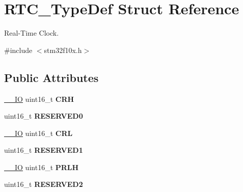 \hypertarget{struct_r_t_c___type_def}{\section{R\-T\-C\-\_\-\-Type\-Def Struct Reference}
\label{struct_r_t_c___type_def}
}


Real-\/\-Time Clock.  




{\ttfamily \#include $<$stm32f10x.\-h$>$}

\subsection*{Public Attributes}
\begin{DoxyCompactItemize}
\item 
\hypertarget{struct_r_t_c___type_def_aad5162f4b5b15deb174479e8e543db82}{\hyperlink{group___c_m_s_i_s__core__definitions_gaec43007d9998a0a0e01faede4133d6be}{\-\_\-\-\_\-\-I\-O} uint16\-\_\-t {\bfseries C\-R\-H}}\label{struct_r_t_c___type_def_aad5162f4b5b15deb174479e8e543db82}

\item 
\hypertarget{struct_r_t_c___type_def_a6d55bb337c409f849725a774364ce3bc}{uint16\-\_\-t {\bfseries R\-E\-S\-E\-R\-V\-E\-D0}}\label{struct_r_t_c___type_def_a6d55bb337c409f849725a774364ce3bc}

\item 
\hypertarget{struct_r_t_c___type_def_a95b9e1ed044a4e1cc3632326e7250767}{\hyperlink{group___c_m_s_i_s__core__definitions_gaec43007d9998a0a0e01faede4133d6be}{\-\_\-\-\_\-\-I\-O} uint16\-\_\-t {\bfseries C\-R\-L}}\label{struct_r_t_c___type_def_a95b9e1ed044a4e1cc3632326e7250767}

\item 
\hypertarget{struct_r_t_c___type_def_a8a152da628dbdba2e849adf196fa341a}{uint16\-\_\-t {\bfseries R\-E\-S\-E\-R\-V\-E\-D1}}\label{struct_r_t_c___type_def_a8a152da628dbdba2e849adf196fa341a}

\item 
\hypertarget{struct_r_t_c___type_def_a831b0b55bae7921faa7d16c6f3160449}{\hyperlink{group___c_m_s_i_s__core__definitions_gaec43007d9998a0a0e01faede4133d6be}{\-\_\-\-\_\-\-I\-O} uint16\-\_\-t {\bfseries P\-R\-L\-H}}\label{struct_r_t_c___type_def_a831b0b55bae7921faa7d16c6f3160449}

\item 
\hypertarget{struct_r_t_c___type_def_aaa77e68ac9af2be5c095c05a50efe2e4}{uint16\-\_\-t {\bfseries R\-E\-S\-E\-R\-V\-E\-D2}}\label{struct_r_t_c___type_def_aaa77e68ac9af2be5c095c05a50efe2e4}


\end{DoxyCompactItemize}
